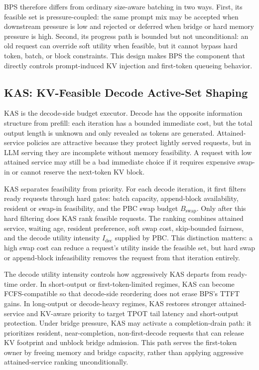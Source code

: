 \documentclass[lettersize,journal]{IEEEtran}
\begin{document}
BPS therefore differs from ordinary size-aware batching in two ways. First, its feasible set is pressure-coupled: the same prompt mix may be accepted when downstream pressure is low and rejected or deferred when bridge or hard memory pressure is high. Second, its progress path is bounded but not unconditional: an old request can override soft utility when feasible, but it cannot bypass hard token, batch, or block constraints. This design makes BPS the component that directly controls prompt-induced KV injection and first-token queueing behavior.

\subsection{KAS: KV-Feasible Decode Active-Set Shaping}

KAS is the decode-side budget executor. Decode has the opposite information structure from prefill: each iteration has a bounded immediate cost, but the total output length is unknown and only revealed as tokens are generated. Attained-service policies are attractive because they protect lightly served requests, but in LLM serving they are incomplete without memory feasibility. A request with low attained service may still be a bad immediate choice if it requires expensive swap-in or cannot reserve the next-token KV block.

KAS separates feasibility from priority. For each decode iteration, it first filters ready requests through hard gates: batch capacity, append-block availability, resident or swap-in feasibility, and the PBC swap budget $B_{\mathrm{swap}}$. Only after this hard filtering does KAS rank feasible requests. The ranking combines attained service, waiting age, resident preference, soft swap cost, skip-bounded fairness, and the decode utility intensity $I_{\mathrm{dec}}$ supplied by PBC. This distinction matters: a high swap cost can reduce a request's utility inside the feasible set, but hard swap or append-block infeasibility removes the request from that iteration entirely.

The decode utility intensity controls how aggressively KAS departs from ready-time order. In short-output or first-token-limited regimes, KAS can become FCFS-compatible so that decode-side reordering does not erase BPS's TTFT gains. In long-output or decode-heavy regimes, KAS restores stronger attained-service and KV-aware priority to target TPOT tail latency and short-output protection. Under bridge pressure, KAS may activate a completion-drain path: it prioritizes resident, near-completion, non-first-decode requests that can release KV footprint and unblock bridge admission. This path serves the first-token owner by freeing memory and bridge capacity, rather than applying aggressive attained-service ranking unconditionally.
\end{document}
